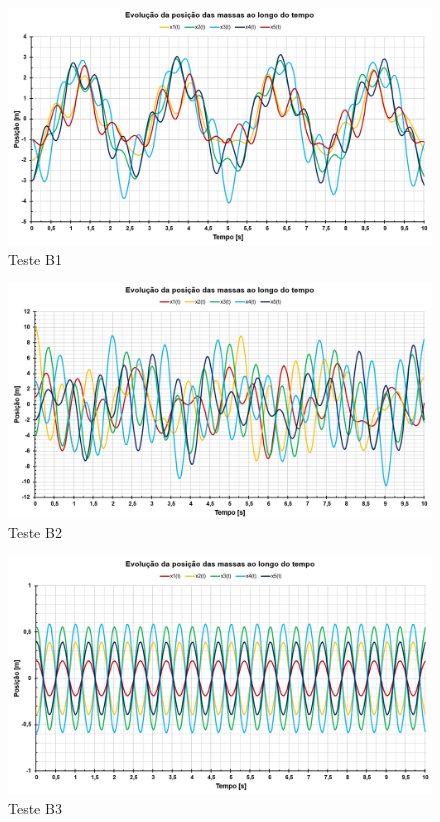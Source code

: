 \documentclass[12pt]{article} %
\begin{document}
        \begin{figure}[H]
            \centering
            \includegraphics[width=0.95\linewidth]{B1.png}
            \caption{Teste B1}
            \label{fig:B1}
        \end{figure}
        
        \begin{figure}[H]
            \centering
            \includegraphics[width=0.95\linewidth]{B2.png}
            \caption{Teste B2}
            \label{fig:B2}
        \end{figure}
        
        \begin{figure}[H]
            \centering
            \includegraphics[width=0.95\linewidth]{B3.png}
            \caption{Teste B3}
            \label{fig:B3}
        \end{figure}
        
\end{document}
